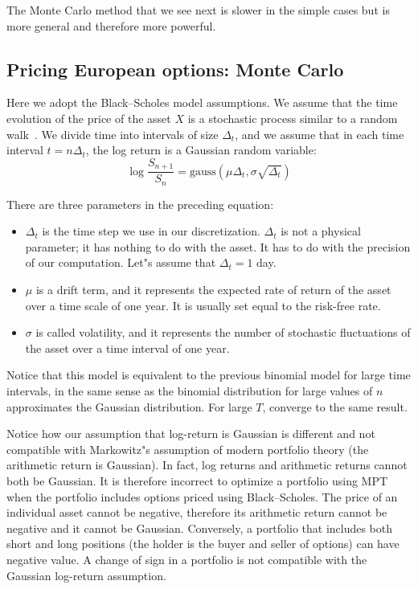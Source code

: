 \documentclass[justified, sixbynine]{tufte-book}
\theoremstyle{plain}%
\newtheorem * {corollary}{Corollary}
\theoremstyle{definition}
\theoremstyle{remark}
\newtheorem * {remark}{Remark}
\newtheorem * {note}{Note}
\begin{document}
\begin{fullwidth}
The Monte Carlo method that we see next is slower in the simple cases but is
more general and therefore more powerful.

\goodbreak\subsection{Pricing European options: Monte Carlo}

Here we adopt the Black--Scholes model assumptions.
We assume that the time evolution of the price of the asset $X$ is
a stochastic process similar to a random walk~\cite{shreve}. We divide time into
intervals of size $\Delta _t$, and we assume that in each time interval $%
t=n\Delta _t$, the log return is a Gaussian random variable:
\begin{equation}
\log \frac{S_{n+1}}{S_n} = \textrm{gauss}(\mu\Delta_t, \sigma\sqrt{\Delta_t}) \label{BS}
\end{equation}

There are three parameters in the preceding equation:

\begin{itemize}
\item  $\Delta _t$ is the time step we use in our discretization. $\Delta _t$
is not a physical parameter; it has nothing to do with the asset. It has to
do with the precision of our computation. Let"s assume that $\Delta _t=1$ day.

\item  $\mu $ is a drift term, and it represents the expected rate of return
of the asset over a time scale of one year. It is usually set equal to the risk-free rate.

\item  $\sigma $ is called volatility, and it represents the number of
stochastic fluctuations of the asset over a time interval of one year.
\end{itemize}

Notice that this model is equivalent to the previous binomial model for large time intervals, in the same sense as the binomial distribution for large values of $n$ approximates the Gaussian distribution. For large $T$, converge to the same result.

Notice how our assumption that log-return is Gaussian is different and not compatible with Markowitz"s assumption of modern portfolio theory (the arithmetic return is Gaussian). In fact, log returns and arithmetic returns cannot both be Gaussian. It is therefore incorrect to optimize a portfolio using MPT when the portfolio includes options priced using Black--Scholes. The price of an individual asset cannot be negative, therefore its arithmetic return cannot be negative and it cannot be Gaussian. Conversely, a portfolio that includes both short and long positions (the holder is the buyer and seller of options) can have negative value. A change of sign in a portfolio is not compatible with the Gaussian log-return assumption.


\end{fullwidth}
\end{document}
